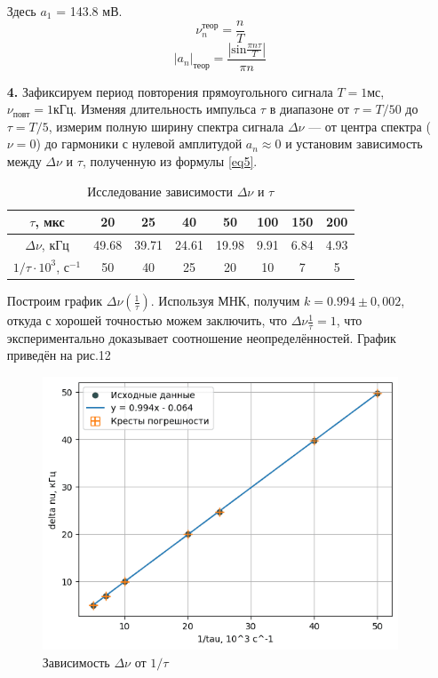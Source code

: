 \documentclass[a4paper,12pt]{article} %
\begin{document}
\begin{enumerate}
	      Здесь $a_1$ = 143.8 мВ.
	      $$\nu_n^\text{теор} = \frac{n}{T}$$
	      $$|a_n|_\text{теор} = \frac{|\text{sin}\frac{\pi n \tau}{T}|}{\pi n}$$

	\item[\textbf{4.}] Зафиксируем период повторения прямоугольного сигнала $T = 1 \text{мс}$, $\nu_\text{повт} = 1\text{кГц}$. Изменяя длительность импульса $\tau$ в диапазоне от
		$\tau=T/50$ до $\tau=T/5$, измерим полную ширину спектра сигнала $\Delta \nu$ — от центра спектра ($\nu = 0$) до гармоники с нулевой амплитудой $a_n \approx 0$ и установим зависимость между $\Delta \nu$ и $\tau$, полученную из формулы \ref{eq5}.

		\begin{table}[h!]
			\centering
			\begin{tabular}{|c|c|c|c|c|c|c|c|}
				\hline
				$\tau$, мкс                   & 20    & 25    & 40    & 50    & 100  & 150  & 200  \\ \hline
				$\Delta \nu$, кГц             & 49.68 & 39.71 & 24.61 & 19.98 & 9.91 & 6.84 & 4.93 \\ \hline
				$1/\tau \cdot 10^3$, с$^{-1}$ & 50    & 40    & 25    & 20    & 10   & 7    & 5    \\ \hline
			\end{tabular}
			\caption{Исследование зависимости $\Delta \nu$ и $\tau$}
			\label{table2}
		\end{table}
		Построим график $\Delta\nu\left(\frac{1}{\tau}\right)$. Используя МНК, получим $k=0.994\pm0,002$, откуда с хорошей точностью можем заключить, что $\Delta\nu\frac{1}{\tau}=1$, что экспериментально доказывает соотношение неопределённостей. График приведён на рис.12
		\begin{figure}[h]
			\centering
			\includegraphics[width=0.7\linewidth]{grafic1.png}
			\caption{Зависимость $\Delta \nu$ от $1/\tau$}
			\label{grafic1}
		\end{figure}


\end{enumerate}
\end{document}
